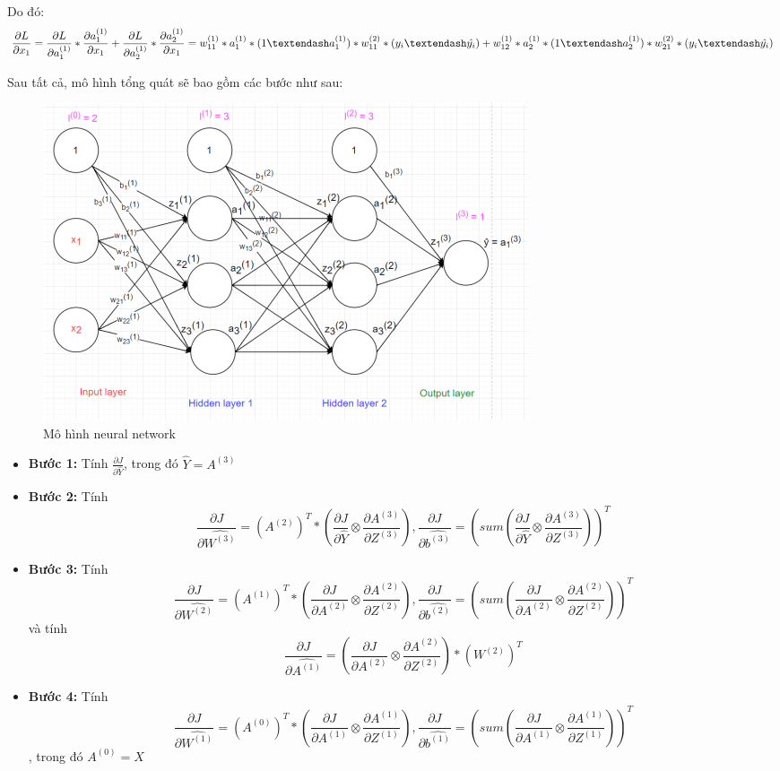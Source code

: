 Do đó:
$$\frac{\partial L}{\partial x_1} = \frac{\partial L}{\partial a_1^{(1)}} * \frac{\partial a_1^{(1)}}{\partial x_1} + \frac{\partial L}{\partial a_2^{(1)}} * \frac{\partial a_2^{(1)}}{\partial x_1} =  w_{11}^{(1)}* a_1 ^ {(1)} * (1 – a_1^{(1)}) * w_{11}^{(2)} * (y_i – \hat{y_i}) + w_{12}^{(1)}* a_2 ^ {(1)} * (1 – a_2^{(1)}) * w_{21}^{(2)} * (y_i – \hat{y_i})  \newline$$

Sau tất cả, mô hình tổng quát sẽ bao gồm các bước như sau:

\FloatBarrier
\begin{figure}[htp]
\begin{center}
\includegraphics[scale=0.75]{chap2/c2_figs/3.png}
\end{center}
\caption{Mô hình neural network}
\label{fig:feed_forward}
\end{figure}
\FloatBarrier

\begin{itemize}
\item \textbf{Bước 1:} Tính $\frac{\partial J}{\partial \hat{Y}}$, trong đó $\hat{Y} = A^{(3)}$
\item \textbf{Bước 2:} Tính $$\frac{\partial J}{\partial \hat{W^{(3)}}}= (A^{(2)})^T * (\frac{\partial J}{\partial \hat{Y}} \otimes \frac{\partial A^{(3)}}{\partial Z^{(3)}}),  \frac{\partial J}{\partial \hat{b^{(3)}}}= (sum( \frac{\partial J}{\partial \hat{Y}} \otimes \frac{\partial A^{(3)}}{\partial Z^{(3)}}))^T$$
\item \textbf{Bước 3:} Tính $$\frac{\partial J}{\partial \hat{W^{(2)}}}= (A^{(1)})^T * (\frac{\partial J}{\partial A^{(2)}} \otimes \frac{\partial A^{(2)}}{\partial Z^{(2)}}),  \frac{\partial J}{\partial \hat{b^{(2)}}}= (sum (\frac{\partial J}{\partial A^{(2)}} \otimes \frac{\partial A^{(2)}}{\partial Z^{(2)}}))^T$$ và tính $$\frac{\partial J}{\partial \hat{A^{(1)}}}= ( \frac {\partial J}{\partial A^{(2)}} \otimes \frac{\partial A^{(2)}}{\partial Z^{(2)}}) * (W^{(2)})^T$$ 
\item \textbf{Bước 4:} Tính $$\frac{\partial J}{\partial \hat{W^{(1)}}}= (A^{(0)})^T  * (\frac{\partial J}{\partial A^{(1)}} \otimes \frac{\partial A^{(1)}}{\partial Z^{(1)}}),  \frac{\partial J}{\partial \hat{b^{(1)}}}= (sum (\frac{\partial J}{\partial A^{(1)}} \otimes \frac{\partial A^{(1)}}{\partial Z^{(1)}}))^T$$ , trong đó $A^{(0)} = X$
\end{itemize}

